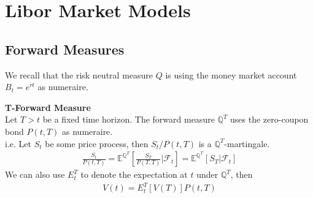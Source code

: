 \section{Libor Market Models}
\label{sec:4_LMM}
\subsection{Forward Measures}
We recall that the risk neutral measure $Q$ is using 
the money market account $B_t = e^{rt}$ as numeraire.\\

\begin{definition}
    \textbf{T-Forward Measure}\\
    Let $T > t$ be a fixed time horizon. The forward measure 
    $\mathbb{Q}^{T}$ uses the zero-coupon bond $P(t, T)$ as numeraire.\\
    i.e. Let $S_t$ be some price process,
    then $S_t / P(t, T)$ is a $\mathbb{Q}^{T}$-martingale.
    \begin{align*}
        \frac{S_t}{P(t, T)} = \mathbb{E}^{\mathbb{Q}^{T}}
        \left[ \frac{S_T}{P(T, T)} \Big| \mathcal{F}_t \right]
        = \mathbb{E}^{\mathbb{Q}^{T}} 
        \left[ S_T \Big| \mathcal{F}_t \right]
    \end{align*}
    We can also use $E_t^T$ to denote the expectation at $t$
    under $\mathbb{Q}^{T}$, then 
    \begin{align*}
        V(t) = E_t^T[V(T)] P(t, T)
    \end{align*}
\end{definition}